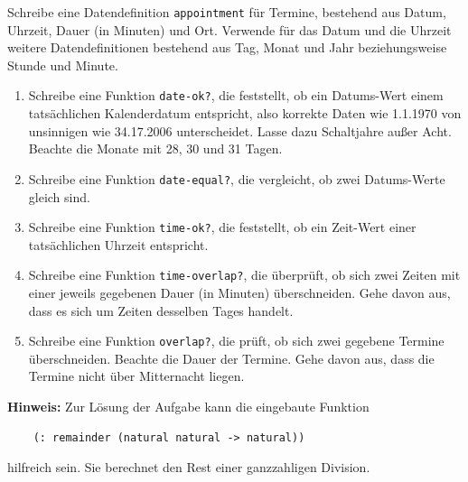 \begin{aufgabe}

  Schreibe eine Datendefinition
  \lstinline{appointment} für Termine, bestehend aus Datum, Uhrzeit,
  Dauer (in Minuten) und Ort.  Verwende für das Datum und die
  Uhrzeit weitere Datendefinitionen bestehend aus Tag, Monat und Jahr
  beziehungsweise Stunde und Minute.

  \begin{enumerate}
  \item Schreibe eine Funktion \lstinline{date-ok?}, die feststellt,
    ob ein Datums-Wert einem tatsächlichen Kalenderdatum entspricht,
    also korrekte Daten wie 1.1.1970 von unsinnigen wie 34.17.2006
    unterscheidet. Lasse dazu Schaltjahre außer Acht. Beachte
    die Monate mit 28, 30 und 31 Tagen.
  \item Schreibe eine Funktion \lstinline{date-equal?}, die
    vergleicht, ob zwei Datums-Werte gleich sind.
  \item Schreibe eine Funktion \lstinline{time-ok?}, die feststellt,
    ob ein Zeit-Wert einer tatsächlichen Uhrzeit entspricht.
  \item Schreibe eine Funktion \lstinline{time-overlap?}, die
    überprüft, ob sich zwei Zeiten mit einer jeweils gegebenen Dauer
    (in Minuten) überschneiden. Gehe davon aus, dass es sich um
    Zeiten desselben Tages handelt.
  \item Schreibe eine Funktion \lstinline{overlap?}, die prüft, ob
    sich zwei gegebene Termine überschneiden. Beachte die Dauer
    der Termine. Gehe davon aus, dass die Termine nicht über
    Mitternacht liegen.
  \end{enumerate}
  \textbf{Hinweis:} Zur Lösung der Aufgabe kann die eingebaute
  Funktion
  \begin{lstlisting}
    (: remainder (natural natural -> natural))
  \end{lstlisting}

  hilfreich sein. Sie berechnet den Rest einer ganzzahligen Division.

\end{aufgabe}

